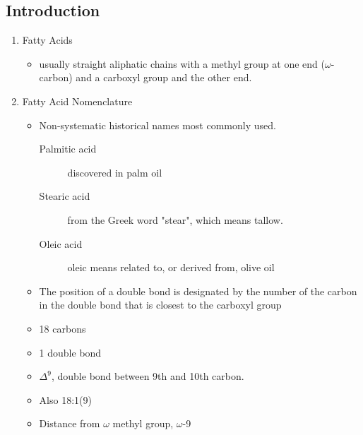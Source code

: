 \documentclass{scrartcl}
\begin{document}
\subsection{Introduction}
\label{sec:org646bb95}
\begin{enumerate}
\item Fatty Acids
\label{sec:orgf0393e3}
\begin{itemize}
\item usually straight aliphatic chains with a methyl group at one end
(\(\omega\)-carbon) and a carboxyl group and the other end.
\end{itemize}


\item Fatty Acid Nomenclature
\label{sec:orgba5d4dc}
\begin{itemize}
\item Non-systematic historical names most commonly used.
\begin{description}
\item[{Palmitic acid}] discovered in palm oil
\item[{Stearic acid}] from the Greek word "stear", which means tallow.
\item[{Oleic acid}] oleic means related to, or derived from, olive oil
\end{description}
\item The position of a double bond is designated by the number of the carbon in the double bond that is closest to the carboxyl group
\end{itemize}



\begin{itemize}
\item 18 carbons
\item 1 double bond
\item \(\Delta^{\text{9}}\), double bond between 9th and 10th carbon.
\item Also 18:1(9)
\item Distance from \(\omega\) methyl group, \(\omega\)-9
\end{itemize}


\end{enumerate}
\end{document}
